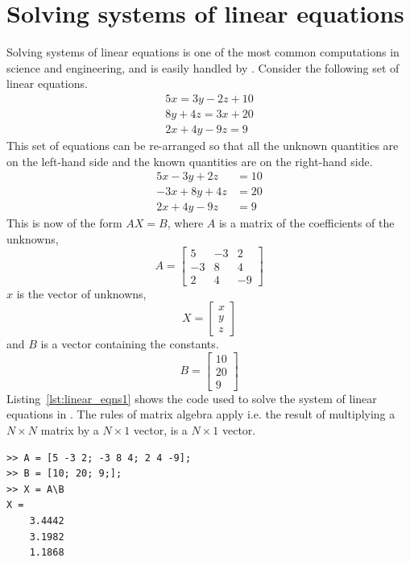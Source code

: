\section{Solving systems of linear equations}
Solving systems of linear equations is one of the most common computations in science and engineering, and is easily handled by \mlab. Consider the following set of linear equations.
\begin{equation*}
\begin{split}
5x = 3y - 2z + 10 \\
8y + 4z = 3x + 20\\
2x + 4y -9z = 9
\end{split}
\end{equation*}
This set of equations can be re-arranged so that all the unknown quantities are on the left-hand side and the known quantities are on the right-hand side.
\begin{equation*}
\begin{split}
5x - 3y + 2z &= 10 \\
-3x + 8y + 4z &= 20 \\
2x + 4y - 9z &= 9
\end{split}
\end{equation*}
This is now of the form $AX=B$, where $A$ is a matrix of the coefficients of the unknowns,
\begin{equation*}
A=\left[ \begin{array}{rrr} 5 & -3 & 2 \\ -3 & 8 & 4 \\ 2 & 4 & -9 \end{array} \right]
\end{equation*}
$x$ is the vector of unknowns,
\begin{equation*}
X=\left[ \begin{array}{c} x \\ y \\ z \end{array} \right]
\end{equation*}
and $B$ is a vector containing the constants.
\begin{equation*}
B=\left[ \begin{array}{c} 10 \\ 20 \\ 9 \end{array} \right]
\end{equation*}
Listing~\ref{lst:linear_eqns1} shows the code used to solve the system of linear equations in \mlab. The rules of matrix algebra apply i.e. the result of multiplying a $N \times N$ matrix by a $N \times 1$ vector, is a $N \times 1$ vector.
\newpage
\begin{lstlisting}[caption={Solving a system of linear equations},label=lst:linear_eqns1]
>> A = [5 -3 2; -3 8 4; 2 4 -9];
>> B = [10; 20; 9;];
>> X = A\B
X = 
	3.4442
	3.1982
	1.1868
\end{lstlisting}
